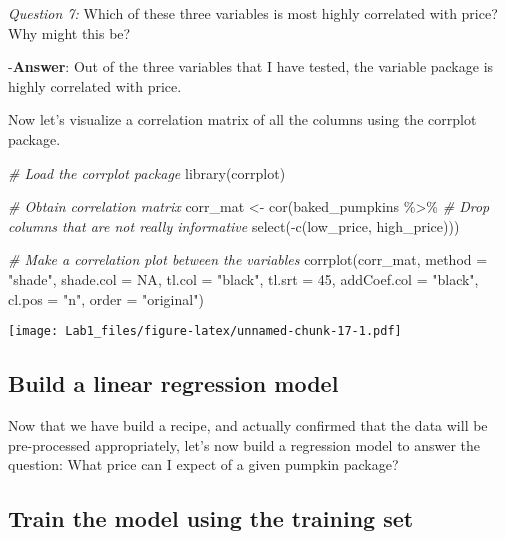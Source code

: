 \documentclass[
]{article}
\newenvironment{Shaded}{\begin{snugshade}}{\end{snugshade}}
\newcommand{\AttributeTok}[1]{\textcolor[rgb]{0.77,0.63,0.00}{#1}}
\newcommand{\CommentTok}[1]{\textcolor[rgb]{0.56,0.35,0.01}{\textit{#1}}}
\newcommand{\ConstantTok}[1]{\textcolor[rgb]{0.00,0.00,0.00}{#1}}
\newcommand{\DecValTok}[1]{\textcolor[rgb]{0.00,0.00,0.81}{#1}}
\newcommand{\FunctionTok}[1]{\textcolor[rgb]{0.00,0.00,0.00}{#1}}
\newcommand{\NormalTok}[1]{#1}
\newcommand{\OtherTok}[1]{\textcolor[rgb]{0.56,0.35,0.01}{#1}}
\newcommand{\SpecialCharTok}[1]{\textcolor[rgb]{0.00,0.00,0.00}{#1}}
\newcommand{\StringTok}[1]{\textcolor[rgb]{0.31,0.60,0.02}{#1}}
\begin{document}
\emph{Question 7:} Which of these three variables is most highly
correlated with price? Why might this be?

-\textbf{Answer}: Out of the three variables that I have tested, the
variable package is highly correlated with price.

Now let's visualize a correlation matrix of all the columns using the
corrplot package.

\begin{Shaded}
\begin{Highlighting}[]
\CommentTok{\# Load the corrplot package}
\FunctionTok{library}\NormalTok{(corrplot)}

\CommentTok{\# Obtain correlation matrix}
\NormalTok{corr\_mat }\OtherTok{\textless{}{-}} \FunctionTok{cor}\NormalTok{(baked\_pumpkins }\SpecialCharTok{\%\textgreater{}\%} 
                  \CommentTok{\# Drop columns that are not really informative}
                  \FunctionTok{select}\NormalTok{(}\SpecialCharTok{{-}}\FunctionTok{c}\NormalTok{(low\_price, high\_price)))}

\CommentTok{\# Make a correlation plot between the variables}
\FunctionTok{corrplot}\NormalTok{(corr\_mat, }\AttributeTok{method =} \StringTok{"shade"}\NormalTok{, }\AttributeTok{shade.col =} \ConstantTok{NA}\NormalTok{, }\AttributeTok{tl.col =} \StringTok{"black"}\NormalTok{, }\AttributeTok{tl.srt =} \DecValTok{45}\NormalTok{, }\AttributeTok{addCoef.col =} \StringTok{"black"}\NormalTok{, }\AttributeTok{cl.pos =} \StringTok{"n"}\NormalTok{, }\AttributeTok{order =} \StringTok{"original"}\NormalTok{)}
\end{Highlighting}
\end{Shaded}

\texttt{[image: Lab1\_files/figure-latex/unnamed-chunk-17-1.pdf]}

\hypertarget{build-a-linear-regression-model}{%
\subsection{Build a linear regression
model}\label{build-a-linear-regression-model}}

Now that we have build a recipe, and actually confirmed that the data
will be pre-processed appropriately, let's now build a regression model
to answer the question: What price can I expect of a given pumpkin
package?

\hypertarget{train-the-model-using-the-training-set}{%
\subsection{Train the model using the training
set}\label{train-the-model-using-the-training-set}}
\end{document}

